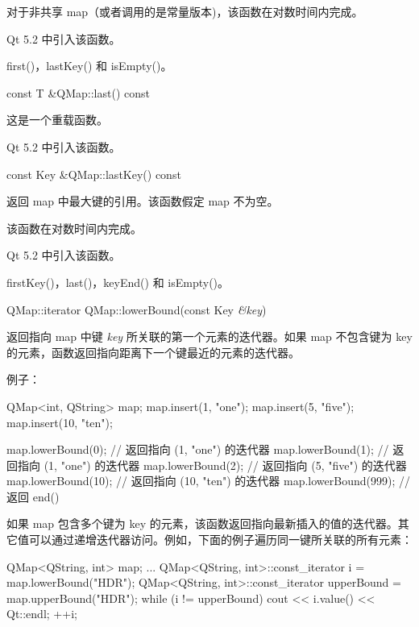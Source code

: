 对于非共享 map（或者调用的是常量版本)，该函数在对数时间内完成。

Qt 5.2 中引入该函数。

\begin{seeAlso}
first()，lastKey() 和 isEmpty()。
\end{seeAlso}

\splitLine

const T \&QMap::last() const

这是一个重载函数。

Qt 5.2 中引入该函数。

\splitLine

const Key \&QMap::lastKey() const

返回 map 中最大键的引用。该函数假定 map 不为空。

该函数在对数时间内完成。

Qt 5.2 中引入该函数。

\begin{seeAlso}
firstKey()，last()，keyEnd() 和 isEmpty()。
\end{seeAlso}

\splitLine

QMap::iterator QMap::lowerBound(const Key \emph{\&key})

返回指向 map 中键 \emph{key} 所关联的第一个元素的迭代器。如果 map 不包含键为 key 的元素，函数返回指向距离下一个键最近的元素的迭代器。

例子：

\begin{cppcode}
QMap<int, QString> map;
map.insert(1, "one");
map.insert(5, "five");
map.insert(10, "ten");

map.lowerBound(0);      // 返回指向 (1, "one") 的迭代器
map.lowerBound(1);      // 返回指向 (1, "one") 的迭代器
map.lowerBound(2);      // 返回指向 (5, "five") 的迭代器
map.lowerBound(10);     // 返回指向 (10, "ten") 的迭代器
map.lowerBound(999);    // 返回 end()
\end{cppcode}

如果 map 包含多个键为 key 的元素，该函数返回指向最新插入的值的迭代器。其它值可以通过递增迭代器访问。例如，下面的例子遍历同一键所关联的所有元素：

\begin{cppcode}
QMap<QString, int> map;
...
QMap<QString, int>::const_iterator i = map.lowerBound("HDR");
QMap<QString, int>::const_iterator upperBound = map.upperBound("HDR");
while (i != upperBound) {
    cout << i.value() << Qt::endl;
    ++i;
}
\end{cppcode}

